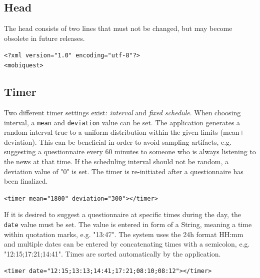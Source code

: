 \documentclass[11pt,a4paper,titlepage]{article}
\begin{document}
\subsection{Head}

The head consists of two lines that must not be changed, but may become obsolete in future releases.

\begin{center}
\begin{tcolorbox}[colback=black!10!white,colframe=black!50!white, boxsep=1pt,left=4pt,right=4pt,top=4pt,bottom=2pt]
\texttt{<?xml version="1.0" encoding="utf-8"?>\\
<mobiquest>}
\end{tcolorbox}
\end{center}


\subsection{Timer}

Two different timer settings exist: \textit{interval} and \textit{fixed schedule}. When choosing interval, a \texttt{mean} and \texttt{deviation} value can be set. The application generates a random interval true to a uniform distribution within the given limits (mean$\pm$deviation). This can be beneficial in order to avoid sampling artifacts, e.g. suggesting a questionnaire every 60 minutes to someone who is always listening to the news at that time. If the scheduling interval should not be random, a deviation value of "0" is set. The timer is re-initiated after a questionnaire has been finalized.

\begin{center}
\begin{tcolorbox}[colback=black!10!white,colframe=black!50!white, boxsep=1pt,left=4pt,right=4pt,top=4pt,bottom=2pt]
\texttt{<timer mean="1800" deviation="300"></timer>}
\end{tcolorbox}
\end{center}

If it is desired to suggest a questionnaire at specific times during the day, the \texttt{date} value must be set. The value is entered in form of a String, meaning a time within quotation marks, e.g. "13:47". The system uses the 24h format HH:mm and multiple dates can be entered by concatenating times with a semicolon, e.g. "12:15;17:21;14:41". Times are sorted automatically by the application. 

\begin{center}
\begin{tcolorbox}[colback=black!10!white,colframe=black!50!white, boxsep=1pt,left=4pt,right=4pt,top=4pt,bottom=2pt]
\texttt{<timer date="12:15;13:13;14:41;17:21;08:10;08:12"></timer>}
\end{tcolorbox}
\end{center}
\end{document}
